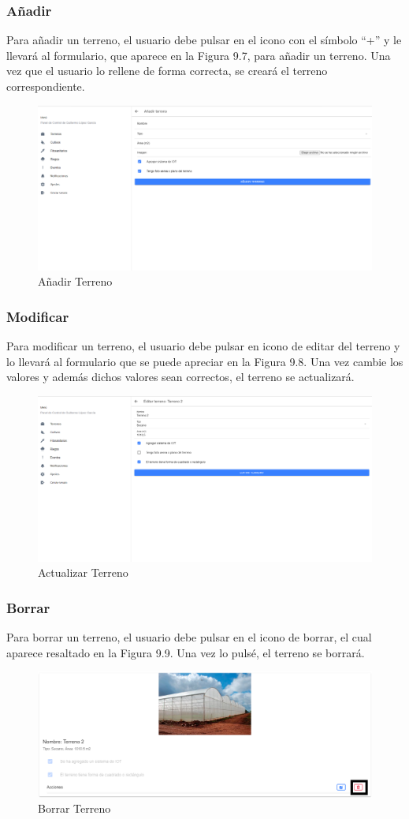 \subsubsection{Añadir}
Para añadir un terreno, el usuario debe pulsar en el icono con el símbolo ``+'' y le llevará al formulario, que aparece en la Figura 9.7, para añadir un terreno. Una vez que el usuario lo rellene de forma correcta, se creará el terreno correspondiente.
\begin{figure}[H]
    \centering
    \includegraphics[width=0.7\linewidth]{images/user-manual/farmableland/create.png}
    \caption{Añadir Terreno}
\end{figure}

\subsubsection{Modificar}
Para modificar un terreno, el usuario debe pulsar en icono de editar del terreno y lo llevará al formulario que se puede apreciar en la Figura 9.8. Una vez cambie los valores y además dichos valores sean correctos, el terreno se actualizará.
\begin{figure}[H]
    \centering
    \includegraphics[width=0.7\linewidth]{images/user-manual/farmableland/update.png}
    \caption{Actualizar Terreno}
\end{figure}

\subsubsection{Borrar}
Para borrar un terreno, el usuario debe pulsar en el icono de borrar, el cual aparece resaltado en la Figura 9.9.
Una vez lo pulsé, el terreno se borrará.
\begin{figure}[H]
    \centering
    \includegraphics[width=0.7\linewidth]{images/user-manual/farmableland/delete.png}
    \caption{Borrar Terreno}
\end{figure}


